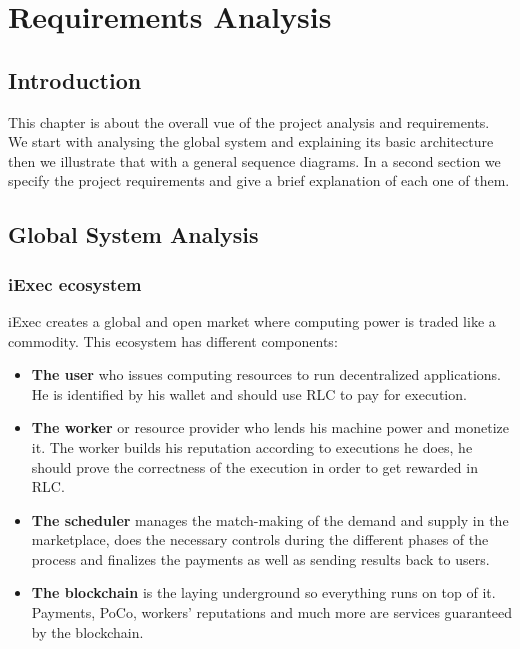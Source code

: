 

\chapter{Requirements Analysis}

\section{Introduction}
    This chapter is about the overall vue of the project analysis and requirements.
    We start with analysing the global system and explaining its basic architecture then we illustrate that with a general
    sequence diagrams. In a second section we specify the project requirements and give a brief explanation of each one of
    them.

\section{Global System Analysis}

    \subsection{iExec ecosystem}
        iExec creates a global and open market where computing power is traded like a commodity. This ecosystem has different
        components\cite{iexec-architecture}:
        \begin{itemize}
            \item \textbf{The user} who issues computing resources to run decentralized applications. He is identified by
            his wallet and should use RLC to pay for execution.

            \item \textbf{The worker} or resource provider who lends his machine power and monetize it. The worker builds his
            reputation according to executions he does, he should prove the correctness of the execution in order to get
            rewarded in RLC.
            
            \item \textbf{The scheduler} manages the match-making of the demand and supply in the marketplace, does the
            necessary controls during the different phases of the process and finalizes the payments as well as sending
            results back to users.

            \item \textbf{The blockchain} is the laying underground so everything runs on top of it. Payments, PoCo,
            workers' reputations and much more are services guaranteed by the blockchain.
        \end{itemize}

